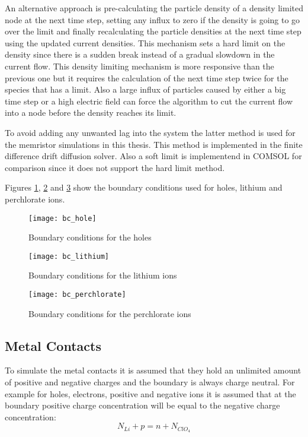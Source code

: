 \begin{doublespace}
An alternative approach is pre-calculating the particle density of a density limited node at the next time step, setting any influx to zero if the density is going to go over the limit and finally recalculating the particle densities at the next time step using the updated current densities. This mechanism sets a hard limit on the density since there is a sudden break instead of a gradual slowdown in the current flow. This density limiting mechanism is more responsive than the previous one but it requires the calculation of the next time step twice for the species that has a limit. Also a large influx of particles caused by either a big time step or a high electric field can force the algorithm to cut the current flow into a node before the density reaches its limit.

To avoid adding any unwanted lag into the system the latter method is used for the memristor simulations in this thesis. This method is implemented in the finite difference drift diffusion solver. Also a soft limit is implementend in  COMSOL\tjs{}\cite{Comsol} for comparison since it does not support the hard limit method.

Figures \ref{bc_hole}, \ref{bc_lithium} and \ref{bc_perchlorate} show the boundary conditions used for holes, lithium and perchlorate ions.

\begin{figure}[!htp]
\centering
\texttt{[image: bc\_hole]}
\caption{Boundary conditions for the holes } 
\label{bc_hole}
\end{figure}

\begin{figure}[!htp]
\centering
\texttt{[image: bc\_lithium]}
\caption{Boundary conditions for the lithium ions } 
\label{bc_lithium}
\end{figure}

\begin{figure}[!htp]
\centering
\texttt{[image: bc\_perchlorate]}
\caption{Boundary conditions for the perchlorate ions } 
\label{bc_perchlorate}
\end{figure}


\clearpage
\subsection{Metal Contacts}
To simulate the metal contacts it is assumed that they hold an unlimited amount of positive and negative charges and the boundary is always charge neutral. For example for holes, electrons,  positive and negative ions it is assumed that at the boundary positive charge concentration will be equal to the negative charge concentration:
\begin{equation}
 N_{Li} + p = n + N_{ClO_{4}}
\label{chargeneutrality}
\end{equation}


\end{doublespace}
